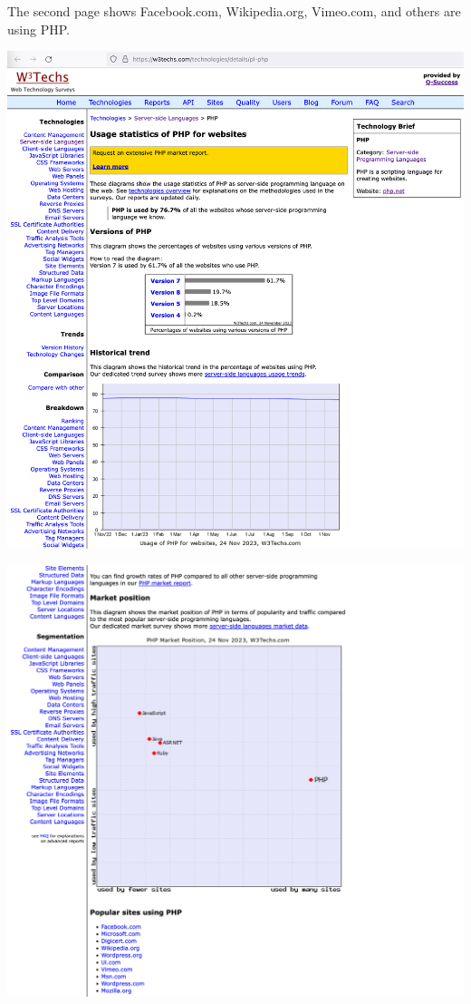 
The second page shows Facebook.com, Wikipedia.org, Vimeo.com, and others are using PHP.

\begin{center}
    \includegraphics[width=40em]{php-websites-p1}
\end{center}
\WillContinue
\pagebreak

\Continuing
\begin{center}
    \includegraphics[width=40em]{php-websites-p2}
\end{center}

\pagebreak
